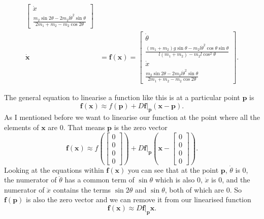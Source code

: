\documentclass{article}
\renewcommand{\vec}[1]{\boldsymbol{\mathbf{#1}}}
\newcommand{\dvec}[1]{\dot{\vec{#1}}}
\begin{document}
\begin{align*}
\begin{bmatrix}
                                         \dot{x}                                                                                                              \\
                                         \frac{m_2 \sin 2 \theta - 2 m_2 l \dot{\theta}^2 \sin \theta}{2 m_1 + m_2 - m_2 \cos 2 \theta}
                                       \end{bmatrix}    \\
  \dvec{x}         & = \vec{f}(\vec{x}) = \begin{bmatrix}
                                            \dot{\theta}                                                                                                         \\
                                            \frac{(m_1 + m_2) g \sin \theta - m_2 l \dot{\theta}^2 \cos \theta \sin \theta}{l (m_1 + m_2) - m_2 l \cos^2 \theta} \\
                                            \dot{x}                                                                                                              \\
                                            \frac{m_2 \sin 2 \theta - 2 m_2 l \dot{\theta}^2 \sin \theta}{2 m_1 + m_2 - m_2 \cos 2 \theta}
                                          \end{bmatrix}.
\end{align*}

The general equation to linearise a function like this is at a particular point $\vec{p}$ is \[\vec{f}(\vec{x}) \approx f(\vec{p}) + D \vec{f}|_{\vec{p}} (\vec{x} - \vec{p}).\] As I mentioned before we want to linearise our function at the point where all the elements of $\vec{x}$ are $0$. That means $\vec{p}$ is the zero vector \[\vec{f}(\vec{x}) \approx f \left( \begin{bmatrix}
      0 \\
      0 \\
      0 \\
      0
    \end{bmatrix} \right) + D \vec{f}|_{\vec{p}} \left( \vec{x} - \begin{bmatrix}
    0 \\
    0 \\
    0 \\
    0
\end{bmatrix} \right).\] Looking at the equations within $\vec{f}(\vec{x})$ you can see that at the point $\vec{p}$, $\dot{\theta}$ is $0$, the numerator of $\ddot{\theta}$ has a common term of $\sin \theta$ which is also $0$, $\dot{x}$ is $0$, and the numerator of $\ddot{x}$ contains the terms $\sin 2 \theta$ and $\sin \theta$, both of which are $0$. So $\vec{f}(\vec{p})$ is also the zero vector and we can remove it from our linearised function \[\vec{f}(\vec{x}) \approx D \vec{f}|_{\vec{p}} \vec{x}.\]
\end{document}
